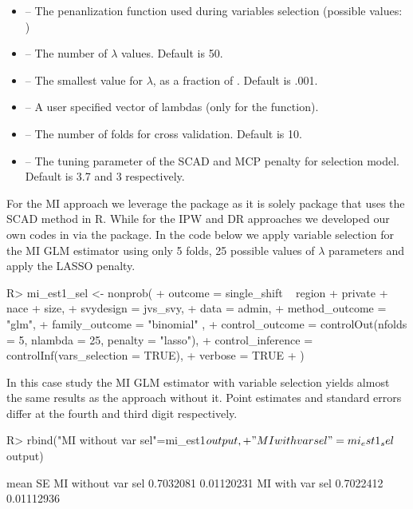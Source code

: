 \documentclass[
]{jss}
\begin{document}
\begin{itemize}
\item {} -- The penanlization function used during variables selection (possible values: )
\item {} -- The number of $\lambda$ values. Default is 50.
\item {} -- The smallest value for $\lambda$, as a fraction of . Default is .001.
\item {} -- A user specified vector of lambdas (only for the  function).
\item {} -- The number of folds for cross validation. Default is 10.
\item {} -- The tuning parameter of the SCAD and MCP penalty for selection model. Default is 3.7 and 3 respectively.
\end{itemize}

For the MI approach we leverage the  package \citep{ncvreg}
as it is solely package that uses the SCAD method in R. While for the
IPW and DR approaches we developed our own codes in  via
the  package. In the code below we apply variable selection
for the MI GLM estimator using only 5 folds, 25 possible values of
\(\lambda\) parameters and apply the LASSO penalty.

\begin{CodeChunk}
\begin{CodeInput}
R> mi_est1_sel <- nonprob(
+   outcome = single_shift ~ region + private + nace + size,
+   svydesign = jvs_svy,
+   data = admin,
+   method_outcome = "glm",
+   family_outcome = "binomial" ,
+   control_outcome = controlOut(nfolds = 5, nlambda = 25, penalty = "lasso"),
+   control_inference = controlInf(vars_selection = TRUE),
+   verbose = TRUE
+ )
\end{CodeInput}
\end{CodeChunk}

In this case study the MI GLM estimator with variable selection yields
almost the same results as the approach without it. Point estimates and
standard errors differ at the fourth and third digit respectively.

\begin{CodeChunk}
\begin{CodeInput}
R> rbind("MI without var sel"=mi_est1$output,
+       "MI with var sel"=mi_est1_sel$output)
\end{CodeInput}
\begin{CodeOutput}
                        mean         SE
MI without var sel 0.7032081 0.01120231
MI with var sel    0.7022412 0.01112936
\end{CodeOutput}
\end{CodeChunk}
\end{document}
